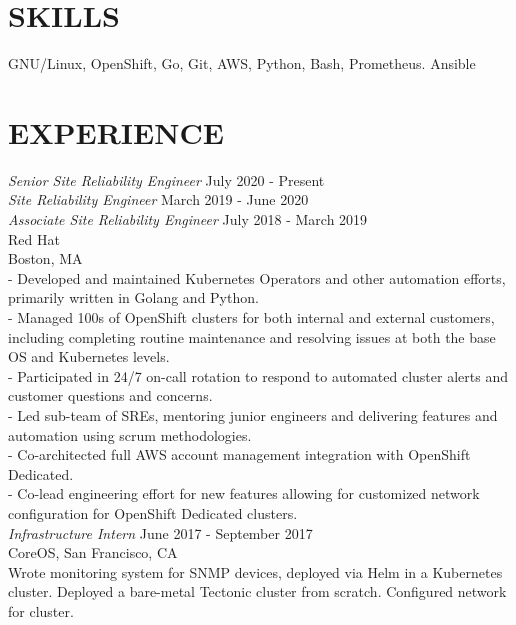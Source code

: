\documentclass[line,margin]{res}
\begin{document}
\address{fahlmantaylor@gmail.com}
\address{github.com/fahlmant, linkedin.com/in/taylorfahlman}
\begin{resume}

                    
\section{SKILLS}
                    GNU/Linux, OpenShift, Go, Git, AWS, Python, Bash, Prometheus. Ansible
                    
\section{EXPERIENCE}
                    {\sl Senior Site Reliability Engineer} \hfill July 2020 - Present\\
                    {\sl Site Reliability Engineer} \hfill March 2019 - June 2020\\
                    {\sl Associate Site Reliability Engineer} \hfill July 2018 - March 2019\\
                    Red Hat\\
                    Boston, MA\\
                    - Developed and maintained Kubernetes Operators and other automation efforts, primarily written in Golang and Python.\\
                    - Managed 100s of OpenShift clusters for both internal and external customers, including completing routine maintenance and resolving issues at both the base OS and Kubernetes levels.\\
                    - Participated in 24/7 on-call rotation to respond to automated cluster alerts and customer questions and concerns.\\
                    - Led sub-team of SREs, mentoring junior engineers and delivering features and automation using scrum methodologies.\\
                    - Co-architected full AWS account management integration with OpenShift Dedicated.\\
                    - Co-lead engineering effort for new features allowing for customized network configuration for OpenShift Dedicated clusters.\\

                    {\sl Infrastructure Intern} \hfill June 2017 - September 2017\\
                    CoreOS,
                    San Francisco, CA\\
                    Wrote monitoring system for SNMP devices, deployed via Helm in a Kubernetes cluster.
                    Deployed a bare-metal Tectonic cluster from scratch. Configured network for cluster.


\end{resume}
\end{document}
